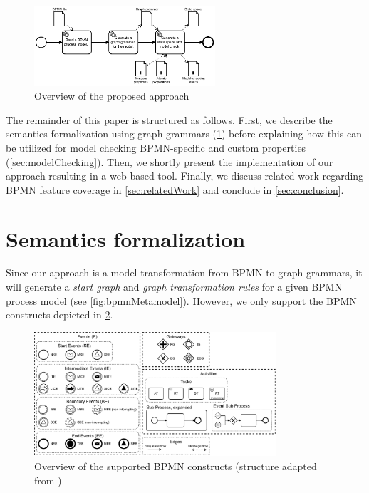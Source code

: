 \documentclass[submission, copyright, creativecommons]{eptcs}
\begin{document}
\begin{figure}[h]
    \centering
    \includegraphics[width=0.6\textwidth]{images/full-approach.pdf}
    \caption{Overview of the proposed approach}
    \label{fig:approach}
\end{figure}

The remainder of this paper is structured as follows.
First, we describe the semantics formalization using graph grammars (\cref{sec:formalization}) before explaining how this can be utilized for model checking BPMN-specific and custom properties (\cref{sec:modelChecking}).
Then, we shortly present the implementation of our approach resulting in a web-based tool.
Finally, we discuss related work regarding BPMN feature coverage in \cref{sec:relatedWork} and conclude in \cref{sec:conclusion}.

\section{Semantics formalization} \label{sec:formalization}

Since our approach is a model transformation from BPMN to graph grammars, it will generate a \emph{start graph} and \emph{graph transformation rules} for a given BPMN process model (see \cref{fig:bpmnMetamodel}).
However, we only support the BPMN constructs depicted in \cref{fig:bpmnConstructsOverview}.

\begin{figure}[h]
    \centering
    \includegraphics[width=0.8\textwidth]{images/bpmn_semantics-feature_overview.pdf}
    \caption{Overview of the supported BPMN constructs (structure adapted from \cite{houhouFirstOrderLogicVerification2022})}
    \label{fig:bpmnConstructsOverview}
\end{figure}
\end{document}
